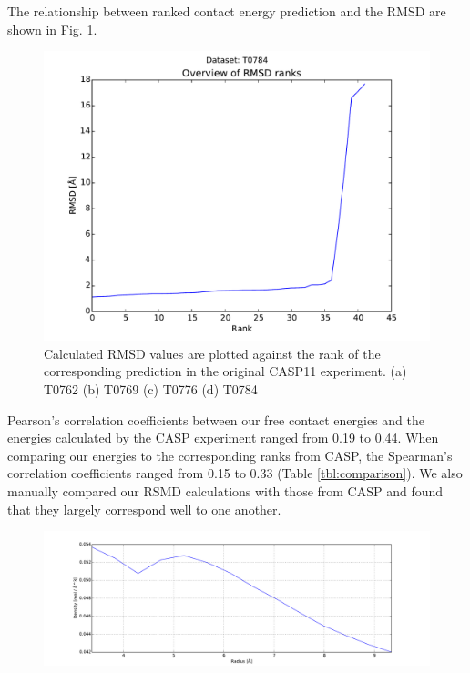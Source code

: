 \documentclass[11pt,a4paper]{article}
\begin{document}
The relationship between ranked contact energy prediction and the RMSD are shown in Fig. \ref{ranks}.

\begin{figure}[!h]
	\centering
	\includegraphics[width=.7\textwidth]{../results/rank_T0784}
	\caption{Calculated RMSD values are plotted against the rank of the corresponding prediction in the original CASP11 experiment. (a) T0762 (b) T0769 (c) T0776 (d) T0784}
	\label{ranks}
\end{figure}

Pearson's correlation coefficients between our free contact energies and the energies calculated by the CASP experiment ranged from 0.19 to 0.44. When comparing our energies to the corresponding ranks from CASP, the Spearman's correlation coefficients ranged from 0.15 to 0.33 (Table \ref{tbl:comparison}). We also manually compared our RSMD calculations with those from CASP and found that they largely correspond well to one another.
%

\begin{figure}[!h]
	\centering
	\includegraphics[width=1\textwidth]{figures/better.pdf}
	\caption{}
	\label{distance}
\end{figure}
\end{document}
